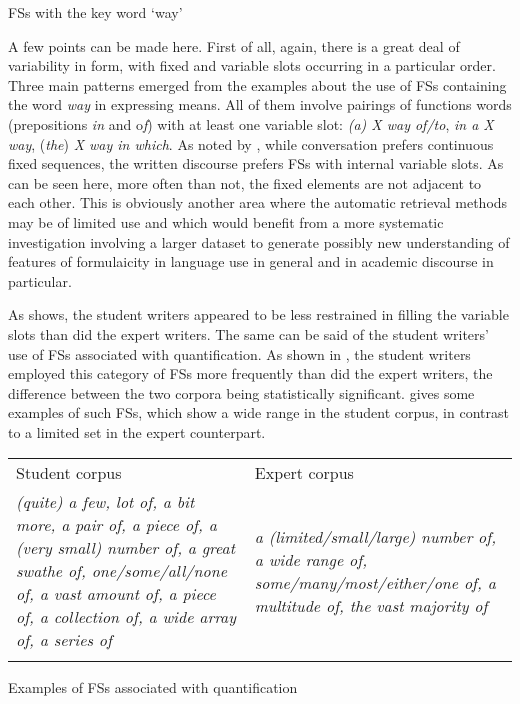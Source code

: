 \documentclass[output=paper]{langsci/langscibook}
\begin{document}
\begin{table}
\caption{FSs with the key word ‘way’}
\label{tab:key:9}
\end{table}

A few points can be made here. First of all, again, there is a great deal of variability in form, with fixed and variable slots occurring in a particular order. Three main patterns emerged from the examples about the use of FSs containing the word \textit{way} in expressing means. All of them involve pairings of functions words (prepositions \textit{in} and o\textit{f}) with at least one variable slot: \textit{(a) X way of/to}, \textit{in a X way}, (\textit{the}) \textit{X way in which}. As noted by \citet{Biber2009}, while conversation prefers continuous fixed sequences, the written discourse prefers FSs with internal variable slots. As can be seen here, more often than not, the fixed elements are not adjacent to each other. This is obviously another area where the automatic retrieval methods may be of limited use and which would benefit from a more systematic investigation involving a larger dataset to generate possibly new understanding of features of formulaicity in language use in general and in academic discourse in particular. 

As  shows, the student writers appeared to be less restrained in filling the variable slots than did the expert writers. The same can be said of the student writers’ use of FSs associated with quantification. As shown in , the student writers employed this category of FSs more frequently than did the expert writers, the difference between the two corpora being statistically significant.  gives some examples of such FSs, which show a wide range in the student corpus, in contrast to a limited set in the expert counterpart. 


\begin{tabularx}{\textwidth}{XX}

\lsptoprule

Student corpus & Expert corpus\\
\textit{(quite) a few, lot of, a bit more, a pair of, a piece of, a (very small) number of, a great swathe of, one/some/all/none of, a vast amount of, a piece of, a collection of, a wide array of, a series of} & \textit{a (limited/small/large) number of, a wide range of, some/many/most/either/one of, a multitude of, the vast majority of}\\
\lspbottomrule
\end{tabularx}
\begin{table}
\caption{Examples of FSs associated with quantification}
\label{tab:key:10}
\end{table}
\end{document}

